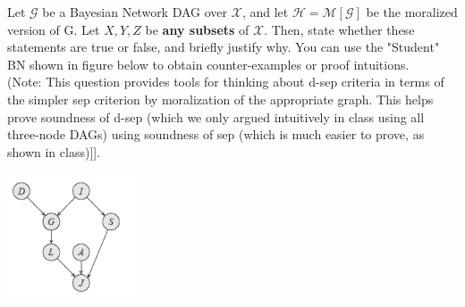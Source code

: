 \documentclass[addpoints,11pt,a4paper]{exam}
\newcommand{\G}{\mathcal{G}}
\newcommand{\fH}{\mathcal{H}}
\newcommand{\M}{\mathcal{M}}
\begin{document}
\begin{questions}
Let $\G$ be a Bayesian Network DAG over $\mathcal{X}$, and let $\fH=\M[\G]$ be the moralized version of G. Let $X,Y,Z$ be {\bf any subsets} of $\mathcal{X}$. Then, state whether these statements are true or false, and briefly justify why. You can use the "Student" BN shown in figure below to obtain counter-examples or proof intuitions. 
\\(Note: This question provides tools for thinking about d-sep criteria in terms of the simpler sep criterion by moralization of the appropriate graph. This helps prove soundness of d-sep (which we only argued intuitively in class using all three-node DAGs) using soundness of sep (which is much easier to prove, as shown in class)]].
\begin{center}
    \includegraphics[width=0.3\textwidth]{assignment1-qn4.png}
\end{center}


\end{questions}
\end{document}
